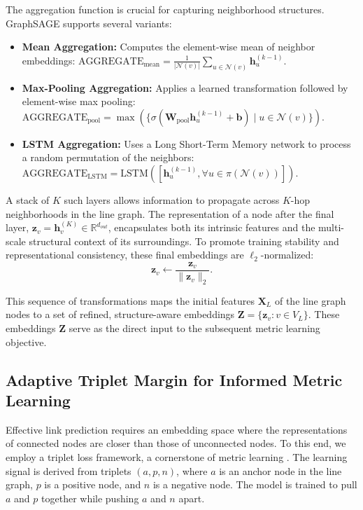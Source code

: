 \documentclass[pdflatex,sn-mathphys-num]{sn-jnl}%
\theoremstyle{thmstyleone}%
\theoremstyle{thmstyletwo}%
\theoremstyle{thmstylethree}%
\theoremstyle{plain} %
\theoremstyle{definition} %
\theoremstyle{remark} %
\theoremstyle{plain} %
\begin{document}
The aggregation function is crucial for capturing neighborhood structures. GraphSAGE supports several variants:
\begin{itemize}
    \item \textbf{Mean Aggregation:} Computes the element-wise mean of neighbor embeddings: $\text{AGGREGATE}_{\text{mean}} = \frac{1}{|\mathcal{N}(v)|} \sum_{u \in \mathcal{N}(v)} \mathbf{h}_u^{(k-1)}$.
    \item \textbf{Max-Pooling Aggregation:} Applies a learned transformation followed by element-wise max pooling: $\text{AGGREGATE}_{\text{pool}} = \max( \{\sigma(\mathbf{W}_{\text{pool}} \mathbf{h}_u^{(k-1)} + \mathbf{b}) \mid u \in \mathcal{N}(v) \} )$.
    \item \textbf{LSTM Aggregation:} Uses a Long Short-Term Memory network to process a random permutation of the neighbors: $\text{AGGREGATE}_{\text{LSTM}} = \text{LSTM}([ \mathbf{h}_u^{(k-1)}, \forall u \in \pi(\mathcal{N}(v)) ])$.
\end{itemize}


A stack of $K$ such layers allows information to propagate across $K$-hop neighborhoods in the line graph. The representation of a node after the final layer, $\mathbf{z}_v = \mathbf{h}_v^{(K)} \in \mathbb{R}^{d_{out}}$, encapsulates both its intrinsic features and the multi-scale structural context of its surroundings. To promote training stability and representational consistency, these final embeddings are  $\ell_2$-normalized:
\begin{equation}
    \mathbf{z}_v \leftarrow \frac{\mathbf{z}_v}{\|\mathbf{z}_v\|_2}.
\end{equation}

This sequence of transformations maps the initial features $\mathbf{X}_L$ of the line graph nodes to a set of refined, structure-aware embeddings $\mathbf{Z} = \{ \mathbf{z}_v : v \in V_L \}$. 
These embeddings $\mathbf{Z}$ serve as the direct input to the subsequent metric learning objective.

%
\subsection{Adaptive Triplet Margin for Informed Metric Learning}
\label{subsec:metric_learning}

Effective link prediction requires an embedding space where the representations of connected nodes are closer than those of unconnected nodes. 
To this end, we employ a triplet loss framework, a cornerstone of metric learning \cite{boutros2021self}. 
The learning signal is derived from triplets $(a, p, n)$, where $a$ is an anchor node in the line graph, $p$ is a positive node, and $n$ is a negative node.
The model is trained to pull $a$ and $p$ together while pushing $a$ and $n$ apart.
\end{document}
